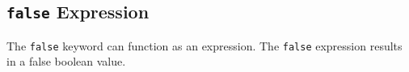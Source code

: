 
\subsection{\texttt{false} Expression}
{
	The \texttt{false} keyword can function as an expression.
	The \texttt{false} expression results in a false boolean value.
}
